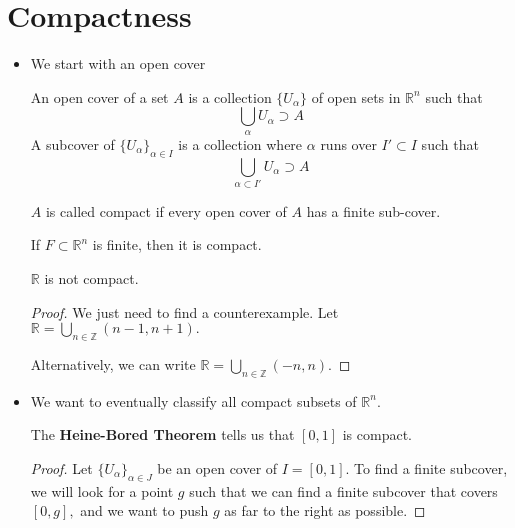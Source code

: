 \section{Compactness}
\begin{itemize}
    \item We start with an open cover
    \begin{definition}
        An open cover of a set $A$ is a collection $\{U_\alpha\}$ of open sets in $\mathbb{R}^n$ such that 
        \begin{equation}
            \bigcup_\alpha U_\alpha \supset A
        \end{equation}
        A subcover of $\{U_\alpha\}_{\alpha \in I}$ is a collection where $\alpha$ runs over $I' \subset I$ such that
        \begin{equation}
            \bigcup_{\alpha \subset I'} U_\alpha \supset A
        \end{equation}
    \end{definition}
    \begin{definition}
        $A$ is called compact if every open cover of $A$ has a finite sub-cover.
    \end{definition}
    \begin{example}
        If $F \subset \mathbb{R}^n$ is finite, then it is compact.
    \end{example}
    \begin{example}
        $\mathbb{R}$ is not compact.
        \begin{proof}
            We just need to find a counterexample. Let $\mathbb{R} = \bigcup_{n\in \mathbb{Z}} (n-1,n+1).$
            \vspace{2mm}

            Alternatively, we can write $\mathbb{R} = \bigcup_{n\in \mathbb{Z}} (-n,n).$
        \end{proof}
    \end{example}
    \item We want to eventually classify all compact subsets of $\mathbb{R}^n$.
    \begin{theorem}
        The \textbf{Heine-Bored Theorem} tells us that $[0,1]$ is compact.
        \begin{proof}
            Let $\{U_\alpha\}_{\alpha \in J}$ be an open cover of $I=[0,1].$ To find a finite subcover, we will look for a point $g$ such that we can find a finite subcover that covers $[0,g],$ and we want to push $g$ as far to the right as possible.
            \vspace{2mm}


\end{proof}
\end{theorem}
\end{itemize}
